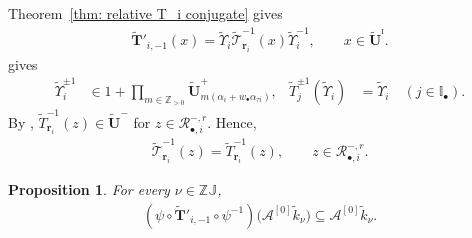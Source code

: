 \documentclass[a4paper,reqno,12pt]{amsart}
\numberwithin{equation}{section}
\newtheorem{proposition}{Proposition}[section]
\theoremstyle{definition}
\theoremstyle{plain}
\theoremstyle{definition}
\def\Z{\mathbb Z}
\def\I{\mathbb I}
\def\J{\mathbb J}
\def\bI{\I_\bullet}
\def\bw{w_\bullet}
\def\br{\mathbf r}
\def\tU{\widetilde{\mathbf U}}
\def\tUi{\widetilde{\mathbf U}^{\imath}}
\def\tTD{\widetilde T}
\def\tT{\widetilde{\mathscr T}}
\def\tTT{\widetilde{\mathbf T}}
\def\tk{\widetilde k}
\def\tfX{\widetilde\Upsilon}
\def\cA{\mathcal A}
\def\cR{\mathcal R}
\newcommand{\tTa}[1]{\tTT'_{#1,-1}}
\begin{document}
Theorem~\ref{thm: relative T_i conjugate} gives
\begin{align}
\tTa{i}(x)
=\tfX_i\tT_{\br_i}^{-1}(x)\tfX_i^{-1},
\qquad x\in\tUi.
\label{eq:intertwiner of iT}
\end{align}
\cite[Remark 3.10, Proposition 4.6]{WZ23} gives
\begin{align}
\tfX_i^{\pm1}
&\in 1+\prod_{m\in\Z_{>0}}\tU_{m(\alpha_i+\bw\alpha_{\tau i})}^+,
&\tTD_j^{\pm1}(\tfX_i)&=\tfX_i\quad(j\in\bI).
\label{eq:quasiK}
\end{align}
By \cite[Lemma 2.16]{KY21}, $\tTD_{\br_i}^{-1}(z)\in\tU^-$ for $z\in\cR_{\bullet,i}^{-,r}$. Hence,
\begin{align}
\tT_{\br_i}^{-1}(z)=\tTD_{\br_i}^{-1}(z),\qquad
z\in\cR_{\bullet,i}^{-,r}.
\label{eq:rescaling-negative}
\end{align}

\begin{proposition}\label{lem:Cartan}
For every $\nu\in\Z\J$,
\begin{align}
(\psi\circ\tTa{i}\circ\psi^{-1})
\bigl(\cA^{[0]}\tk_{\nu}\bigr)\subseteq\cA^{[0]}\tk_{\nu}.\label{eq:Cartan-preserve}
\end{align}
\end{proposition}
\end{document}
